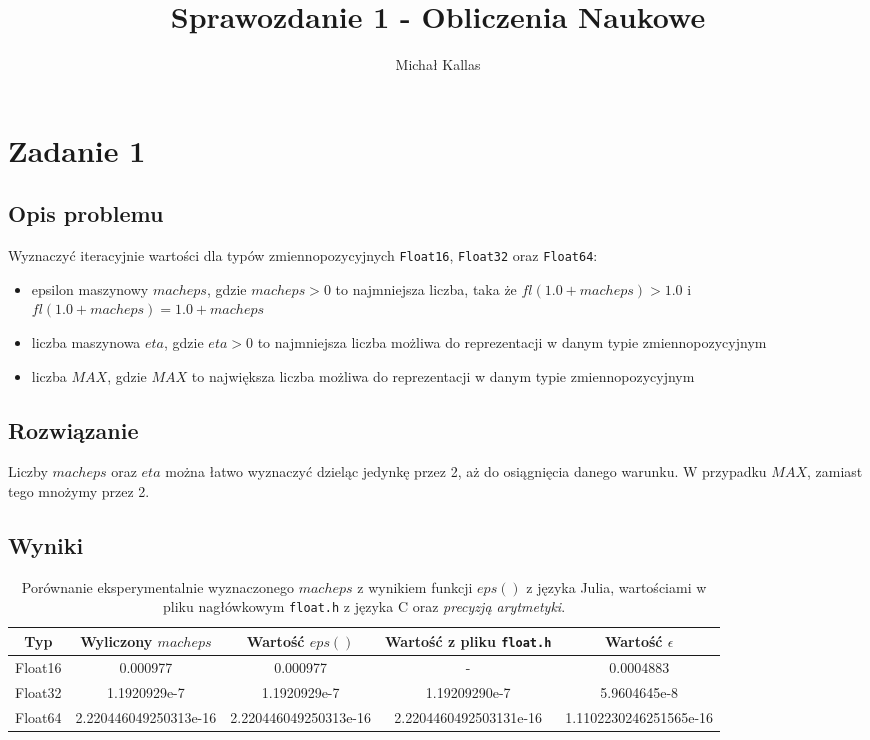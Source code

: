 \documentclass{article}
\title{Sprawozdanie 1 - Obliczenia Naukowe}
\author{Michał Kallas}
\begin{document}
\maketitle

\section{Zadanie 1}
\subsection{Opis problemu}
Wyznaczyć iteracyjnie wartości dla typów zmiennopozycyjnych \texttt{Float16}, \texttt{Float32} oraz \texttt{Float64}:

\begin{itemize}
    \item epsilon maszynowy $macheps$, gdzie $macheps > 0$ to najmniejsza liczba, taka że $fl(1.0 + macheps) > 1.0$ i
    $fl(1.0 + macheps) = 1.0 + macheps$

    \item liczba maszynowa $eta$, gdzie $eta > 0$ to najmniejsza liczba możliwa do reprezentacji w danym typie zmiennopozycyjnym

    \item liczba $MAX$, gdzie $MAX$ to największa liczba możliwa do reprezentacji w danym typie zmiennopozycyjnym
\end{itemize}

\subsection{Rozwiązanie}
Liczby $macheps$ oraz $eta$ można łatwo wyznaczyć dzieląc jedynkę przez 2, aż do osiągnięcia danego warunku. W przypadku
$MAX$, zamiast tego mnożymy przez 2.

\subsection{Wyniki}
\begin{table}[H]
\begin{adjustbox}{center}
\begin{tabular}{|c|c|c|c|c|}
    \hline
    Typ & Wyliczony $macheps$ & Wartość $eps()$ & Wartość z pliku \texttt{float.h} & Wartość $\epsilon$\\
    \hline
    Float16 & 0.000977 & 0.000977 & - & 0.0004883\\
    \hline
    Float32 & 1.1920929e-7 & 1.1920929e-7 & 1.19209290e-7 & 5.9604645e-8\\
    \hline
    Float64 & 2.220446049250313e-16 & 2.220446049250313e-16 & 2.2204460492503131e-16 & 1.1102230246251565e-16\\
    \hline
\end{tabular}
\end{adjustbox}
\caption{Porównanie eksperymentalnie wyznaczonego $macheps$ z wynikiem funkcji $eps()$ z języka Julia, wartościami w
pliku nagłówkowym \texttt{float.h} z języka C oraz \textit{precyzją arytmetyki}.}
\end{table}
\end{document}
